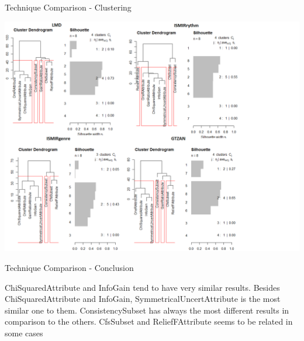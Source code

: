 \begin{frame}{Technique Comparison - Clustering}

\begin{center}
\includegraphics[scale=0.25]{fig/techniques-diagram.png}
\end{center}

\end{frame}

\begin{frame}{Technique Comparison - Conclusion}

\bi
  \mi ChiSquaredAttribute and InfoGain tend to have very similar results.
  \mi Besides ChiSquaredAttribute and InfoGain, SymmetricalUncertAttribute is the most similar one to them.
  \mi ConsistencySubset has always the most different results in comparison to the others.
  \mi CfsSubset and ReliefFAttribute seems to be related in some cases
\ei

\end{frame}

